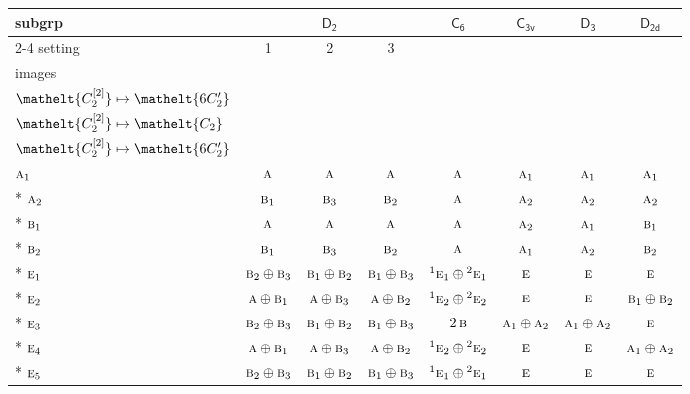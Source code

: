 \documentclass[10pt,a4paper]{article}
\numberwithin{equation}{section}
\newcommand{\eltfont}[1]{{\let\sigma\eltsigma\mathelt{#1}}}
\newcommand{\grp}[1]{\mathsf{#1}}
\newcommand{\irr}[1]{\text{\normalfont\scshape #1}}
\newcommand{\conjpair}[1]{{}^{#1}}
\newcommand{\cls}[1]{\eltfont{#1}}
\newcommand{\genidx}[2]{#1^{[\mathrm{#2}]}}
\begin{document}
{\small\begin{longtable}{@{}lccccccc@{}}\toprule
subgrp & \multicolumn{3}{c}{\href{D2.pdf}{$\grp{D_{2}}$}} & \href{C6.pdf}{$\grp{C_{6}}$} & \href{C3v.pdf}{$\grp{C_{3v}}$} & \href{D3.pdf}{$\grp{D_{3}}$} & \href{D2d.pdf}{$\grp{D_{2d}}$}\\\cmidrule(lr){2-4}
setting & 1 & 2 & 3 &  &  &  & \\
images & {\scriptsize\begin{tabular}[t]{@{}c@{}}$\cls{\genidx{C_{2}}{1}} \mapsto \cls{C_{2}}$\\$\cls{\genidx{C_{2}}{2}} \mapsto \cls{6C_{2}'}$\end{tabular}} & {\scriptsize\begin{tabular}[t]{@{}c@{}}$\cls{\genidx{C_{2}}{1}} \mapsto \cls{6C_{2}'}$\\$\cls{\genidx{C_{2}}{2}} \mapsto \cls{C_{2}}$\end{tabular}} & {\scriptsize\begin{tabular}[t]{@{}c@{}}$\cls{\genidx{C_{2}}{1}} \mapsto \cls{6C_{2}'}$\\$\cls{\genidx{C_{2}}{2}} \mapsto \cls{6C_{2}'}$\end{tabular}} &  &  &  & \\\midrule\endhead
\bottomrule\endfoot\endlastfoot
$\irr{a}_{1}$ & $\irr{a}$ & $\irr{a}$ & $\irr{a}$ & $\irr{a}$ & $\irr{a}_{1}$ & $\irr{a}_{1}$ & $\irr{a}_{1}$\\*
$\irr{a}_{2}$ & $\irr{b}_{1}$ & $\irr{b}_{3}$ & $\irr{b}_{2}$ & $\irr{a}$ & $\irr{a}_{2}$ & $\irr{a}_{2}$ & $\irr{a}_{2}$\\*
$\irr{b}_{1}$ & $\irr{a}$ & $\irr{a}$ & $\irr{a}$ & $\irr{a}$ & $\irr{a}_{2}$ & $\irr{a}_{1}$ & $\irr{b}_{1}$\\*
$\irr{b}_{2}$ & $\irr{b}_{1}$ & $\irr{b}_{3}$ & $\irr{b}_{2}$ & $\irr{a}$ & $\irr{a}_{1}$ & $\irr{a}_{2}$ & $\irr{b}_{2}$\\*
$\irr{e}_{1}$ & $\irr{b}_{2}\oplus \irr{b}_{3}$ & $\irr{b}_{1}\oplus \irr{b}_{2}$ & $\irr{b}_{1}\oplus \irr{b}_{3}$ & $\conjpair{1}\irr{e}_{1}\oplus \conjpair{2}\irr{e}_{1}$ & $\irr{e}$ & $\irr{e}$ & $\irr{e}$\\*
$\irr{e}_{2}$ & $\irr{a}\oplus \irr{b}_{1}$ & $\irr{a}\oplus \irr{b}_{3}$ & $\irr{a}\oplus \irr{b}_{2}$ & $\conjpair{1}\irr{e}_{2}\oplus \conjpair{2}\irr{e}_{2}$ & $\irr{e}$ & $\irr{e}$ & $\irr{b}_{1}\oplus \irr{b}_{2}$\\*
$\irr{e}_{3}$ & $\irr{b}_{2}\oplus \irr{b}_{3}$ & $\irr{b}_{1}\oplus \irr{b}_{2}$ & $\irr{b}_{1}\oplus \irr{b}_{3}$ & $2\,\irr{b}$ & $\irr{a}_{1}\oplus \irr{a}_{2}$ & $\irr{a}_{1}\oplus \irr{a}_{2}$ & $\irr{e}$\\*
$\irr{e}_{4}$ & $\irr{a}\oplus \irr{b}_{1}$ & $\irr{a}\oplus \irr{b}_{3}$ & $\irr{a}\oplus \irr{b}_{2}$ & $\conjpair{1}\irr{e}_{2}\oplus \conjpair{2}\irr{e}_{2}$ & $\irr{e}$ & $\irr{e}$ & $\irr{a}_{1}\oplus \irr{a}_{2}$\\*
$\irr{e}_{5}$ & $\irr{b}_{2}\oplus \irr{b}_{3}$ & $\irr{b}_{1}\oplus \irr{b}_{2}$ & $\irr{b}_{1}\oplus \irr{b}_{3}$ & $\conjpair{1}\irr{e}_{1}\oplus \conjpair{2}\irr{e}_{1}$ & $\irr{e}$ & $\irr{e}$ & $\irr{e}$\\
\bottomrule\end{longtable}}
\end{document}
